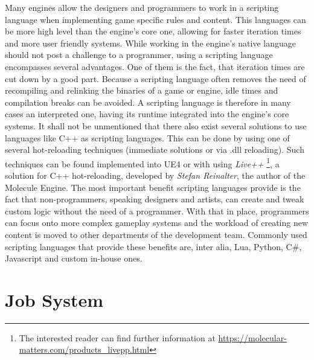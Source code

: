 Many engines allow the designers and programmers to work in a scripting language when implementing game specific rules and content. This languages can be more high level than the engine's core one, allowing for faster iteration times and more user friendly systems. While working in the engine's native language should not post a challenge to a programmer, using a scripting language encompasses several advantages. One of them is the fact, that iteration times are cut down by a good part. Because a scripting language often removes the need of recompiling and relinking the binaries of a game or engine, idle times and compilation breaks can be avoided. A scripting language is therefore in many cases an interpreted one, having its runtime integrated into the engine's core systems. It shall not be unmentioned that there also exist several solutions to use languages like C++ as scripting languages. This can be done by using one of several hot-reloading techniques (immediate solutions or via .dll reloading). Such techniques can be found implemented into \ac{UE4} or with using \textit{Live++} \footnote{The interested reader can find further information at \url{https://molecular-matters.com/products_livepp.html}}, a solution for C++ hot-reloading, developed by \textit{Stefan Reinalter}, the author of the Molecule Engine.
The most important benefit scripting languages provide is the fact that non-programmers, speaking designers and artists, can create and tweak custom logic without the need of a programmer. With that in place, programmers can focus onto more complex gameplay systems and the workload of creating new content is moved to other departments of the development team. Commonly used scripting languages that provide these benefits are, inter alia, Lua, Python, C\#, Javascript and custom in-house ones.

\section{Job System}

